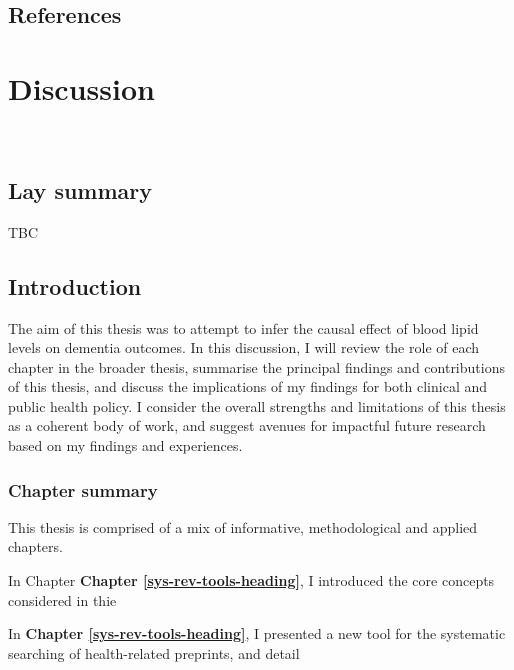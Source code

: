 \documentclass[a4paper, twoside]{templates/ociamthesis}
\begin{document}
\newpage

\hypertarget{references-4}{%
\section{References}\label{references-4}}



\hypertarget{discussion-heading}{%
\chapter{Discussion}\label{discussion-heading}}

\minitoc 

~

\hypertarget{lay-summary-7}{%
\section{Lay summary}\label{lay-summary-7}}

TBC

\newpage

\hypertarget{introduction-4}{%
\section{Introduction}\label{introduction-4}}

The aim of this thesis was to attempt to infer the causal effect of blood lipid levels on dementia outcomes. In this discussion, I will review the role of each chapter in the broader thesis, summarise the principal findings and contributions of this thesis, and discuss the implications of my findings for both clinical and public health policy. I consider the overall strengths and limitations of this thesis as a coherent body of work, and suggest avenues for impactful future research based on my findings and experiences.

\newpage

\hypertarget{chapter-summary}{%
\subsection{Chapter summary}\label{chapter-summary}}

This thesis is comprised of a mix of informative, methodological and applied chapters.

In Chapter \textbf{Chapter \ref{sys-rev-tools-heading}}, I introduced the core concepts considered in thie

In \textbf{Chapter \ref{sys-rev-tools-heading}}, I presented a new tool for the systematic searching of health-related preprints, and detail
\end{document}
